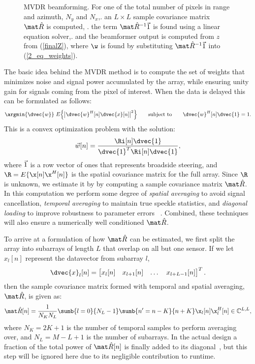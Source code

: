 {\begin{figure}[t]\centering%
%
\caption{MVDR beamforming. For one of the total number of pixels in range and azimuth, $N_y$ and $N_x$,. an $L\times{}L$ sample covariance matrix $\eR$ is computed, . the term $\eR^{-1}\1$ is found using a linear equation solver,. and the beamformer output is computed from $z$ from (\ref{finalZ}), where $\w$ is found by substituting $\eR^{-1}\1$ into (\ref{2_eq_weights}). }\label{mvdr_beamforming}
\end{figure}
%
The basic idea behind the MVDR method is to compute the set of weights that minimizes noise and signal power accumulated by the array, while ensuring unity gain for signals coming from the pixel of interest. When the data is delayed this can be formulated as follows:
%
\begin{gather}
\argmin{\dvec{w}}\ E\Big\{\big|\dvec{w}^H[n]\dvec{x}[n]\big|^2\Big\} \qquad\text{subject to}\qquad \dvec{w}^H[n]\dvec{1} = 1. \label{2_eq_mvdr_def}
\end{gather}
%
This is a convex optimization problem with the solution:
%
\begin{gather}
\vec w[n] = \frac{\Ri[n]\dvec{1}}{\dvec{1}^T\Ri[n]\dvec{1}},\label{2_eq_weights}
\end{gather}
%
where $\vec 1$ is a row vector of ones that represents broadside steering, and $\R=E\{\x[n]\x^H[n]\}$ is the spatial covariance matrix for the full array. Since $\R$ is unknown, we estimate it by by computing a sample covariance matrix $\eR$. In this computation we perform some degree of \emph{spatial averaging} to avoid signal cancellation, \emph{temporal averaging} to maintain true speckle statistics, and \emph{diagonal loading} to improve robustness to parameter errors ~\cite{Synnevag2009a}. Combined, these techniques will also ensure a numerically well conditioned $\eR$. 

To arrive at a formulation of how $\eR$ can be estimated, we first split the array into subarrays of length $L$ that overlap on all but one sensor. If we let $x_l[n]$ represent the datavector from subarray $l$,
%
\begin{gather}
\dvec{x}_l[n] = \bmat{x_l[n] & x_{l+1}[n] & \dots & x_{l+L-1}[n]}^T.
\end{gather}
%
then the sample covariance matrix formed with temporal and spatial averaging, $\eR$, is given as:
%
\begin{gather}
\eR[n] =  \frac{1}{N_K N_L} \sumb{l=0}{N_L-1}\sumb{n'=n-K}{n+K} \x_l[n]\x_l^H[n] \in\mathbb{C}^{L,L},\label{2_eq_spatialR}
\end{gather}
%
where $N_K = 2K+1$ is the number of temporal samples to perform averaging over, and $N_L = M-L+1$ is the number of subarrays. In the actual design a fraction of the total power of $\eR[n]$ is finally added to its diagonal~\cite{Synnevag2007}, but this step will be ignored here due to its negligible contribution to runtime.

}

